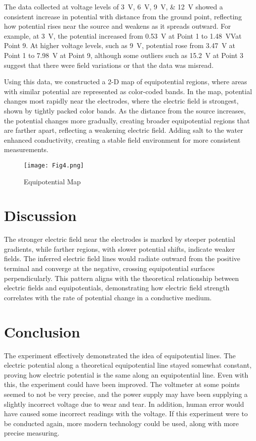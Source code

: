 \documentclass[10pt,journal,twoside]{IEEEtran}
\begin{document}
The data collected at voltage levels of \qtylist{3;6;9;12}{\volt} showed a consistent increase in potential with distance from the ground point, reflecting how potential rises near the source and weakens as it spreads outward. For example, at \qty{3}{\volt}, the potential increased from \qty{0.53}{\volt} at Point 1 to \qty{1.48}{\volt}Vat Point 9. At higher voltage levels, such as \qty{9}{\volt}, potential rose from \qty{3.47}{\volt} at Point 1 to \qty{7.98}{\volt} at Point 9, although some outliers such as \qty{15.2}{\volt} at Point 3 suggest that there were field variations or that the data was misread.

Using this data, we constructed a 2-D map of equipotential regions, where areas with similar potential are represented as color-coded bands. In the map, potential changes most rapidly near the electrodes, where the electric field is strongest, shown by tightly packed color bands. As the distance from the source increases, the potential changes more gradually, creating broader equipotential regions that are farther apart, reflecting a weakening electric field. Adding salt to the water enhanced conductivity, creating a stable field environment for more consistent measurements. 

\begin{figure}
    \centering
    \texttt{[image: Fig4.png]}
    \caption{Equipotential Map}
    \label{fig:equipotential_map}
\end{figure}

\section{Discussion}
The stronger electric field near the electrodes is marked by steeper potential gradients, while farther regions, with slower potential shifts, indicate weaker fields. The inferred electric field lines would radiate outward from the positive terminal and converge at the negative, crossing equipotential surfaces perpendicularly. This pattern aligns with the theoretical relationship between electric fields and equipotentials, demonstrating how electric field strength correlates with the rate of potential change in a conductive medium.

\section{Conclusion}
The experiment effectively demonstrated the idea of equipotential lines. The electric potential along a theoretical equipotential line stayed somewhat constant, proving how electric potential is the same along an equipotential line. Even with this, the experiment could have been improved. The voltmeter at some points seemed to not be very precise, and the power supply may have been supplying a slightly incorrect voltage due to wear and tear. In addition, human error would have caused some incorrect readings with the voltage. If this experiment were to be conducted again, more modern technology could be used, along with more precise measuring.
\end{document}
